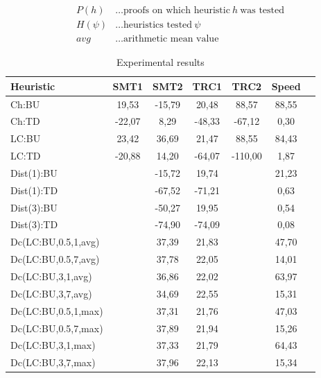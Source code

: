 \documentclass{llncs}
\begin{document}
\begin{align*}
  P(h) &\ldots \text{proofs on which heuristic} \ h \ \text{was tested}\\
	H(\psi) &\ldots \text{heuristics tested} \ \psi \\
	avg & \ldots \text{arithmetic mean value}
\end{align*}
\begin{table}
\centering
\setlength{\tabcolsep}{8pt}
\begin{tabular}{l|c|c|c|c|c|c}
\textbf{Heuristic} & \textbf{SMT1} & \textbf{SMT2} & \textbf{TRC1} & \textbf{TRC2} & \textbf{Speed}\\ 
\toprule
Ch:BU & 19,53 & -15,79 & 20,48 & 88,57 & 88,55 \\ \hline
Ch:TD & -22,07 & 8,29 & -48,33 & -67,12 & 0,30 \\ \hline
LC:BU & 23,42 & 36,69 & 21,47 & 88,55 & 84,43 \\ \hline
LC:TD & -20,88 & 14,20 & -64,07 & -110,00 & 1,87 \\ \hline
Dist(1):BU & & -15,72 & 19,74 & & 21,23 \\ \hline
Dist(1):TD & & -67,52 & -71,21 & & 0,63 \\ \hline
Dist(3):BU & & -50,27 & 19,95 & & 0,54\\ \hline
Dist(3):TD & & -74,90 & -74,09 & & 0,08\\ \hline
Dc(LC:BU,0.5,1,avg) & & 37,39 & 21,83 &  & 47,70\\ \hline
Dc(LC:BU,0.5,7,avg) & & 37,78 & 22,05 &  & 14,01 \\ \hline
Dc(LC:BU,3,1,avg) & & 36,86 & 22,02 &  & 63,97\\ \hline
Dc(LC:BU,3,7,avg) & & 34,69 & 22,55 &  & 15,31 \\ \hline
Dc(LC:BU,0.5,1,max) & & 37,31 & 21,76 &  & 47,03 \\ \hline
Dc(LC:BU,0.5,7,max) & & 37,89 & 21,94 &  & 15,26 \\ \hline
Dc(LC:BU,3,1,max) & & 37,33 & 21,79 &  & 64,43 \\ \hline
Dc(LC:BU,3,7,max) & & 37,96 & 22,13 & & 15,34 \\
\bottomrule
\end{tabular}
\caption{Experimental results}
\label{tab:results}
\end{table}
\end{document}
